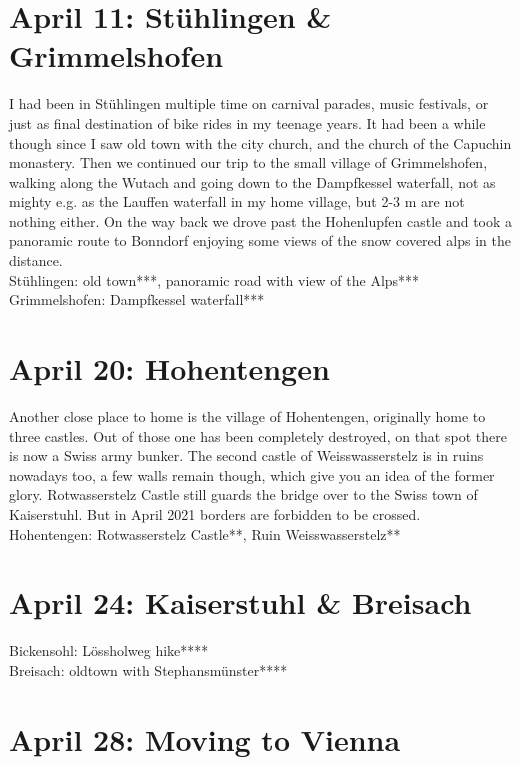 \section{April 11: St\"uhlingen \& Grimmelshofen}
\label{2021Stuehlingen}

I had been in St\"uhlingen multiple time on carnival parades, music festivals, or just as final destination of bike rides in my teenage years. It had been a while though since I saw old town with the city church, and the church of the Capuchin monastery. Then we continued our trip to the small village of Grimmelshofen, walking along the Wutach and going down to the Dampfkessel waterfall, not as mighty e.g. as the Lauffen waterfall in my home village, but 2-3 m are not nothing either. On the way back we drove past the Hohenlupfen castle and took a panoramic route to Bonndorf enjoying some views of the snow covered alps in the distance.\\

St\"uhlingen: old town***, panoramic road with view of the Alps***\\
Grimmelshofen: Dampfkessel waterfall***

\section{April 20: Hohentengen}
\label{2021Hohentengen}

Another close place to home is the village of Hohentengen, originally home to three castles. Out of those one has been completely destroyed, on that spot there is now a Swiss army bunker. The second castle of Weisswasserstelz is in ruins nowadays too, a few walls remain though, which give you an idea of the former glory. Rotwasserstelz Castle still guards the bridge over to the Swiss town of Kaiserstuhl. But in April 2021 borders are forbidden to be crossed.\\

Hohentengen: Rotwasserstelz Castle**, Ruin Weisswasserstelz**

\section{April 24: Kaiserstuhl \& Breisach}
\label{2021Kaiserstuhl}

Bickensohl: L\"ossholweg hike****\\
Breisach: oldtown with Stephansm\"unster****

\section{April 28: Moving to Vienna}
\label{moveVienna}

